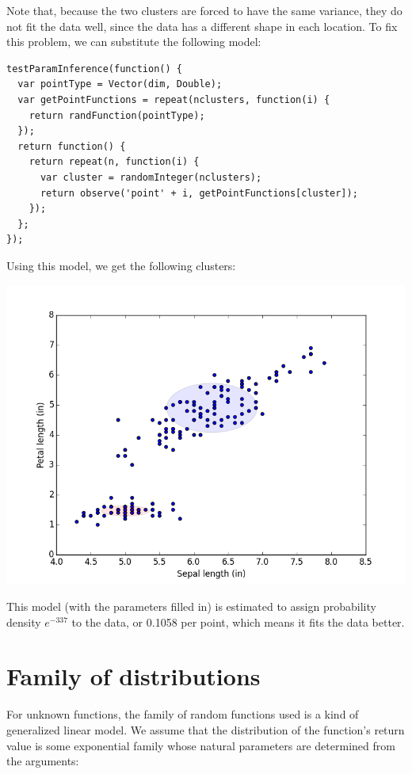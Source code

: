 \documentclass{article}
\begin{document}
  Note that, because the two clusters are forced to have the same variance, they do not fit the data well,
  since the data has a different shape in each location.  To fix this problem, we can substitute the following
  model:
  \begin{verbatim}
testParamInference(function() {
  var pointType = Vector(dim, Double);
  var getPointFunctions = repeat(nclusters, function(i) {
    return randFunction(pointType);
  });
  return function() {
    return repeat(n, function(i) {
      var cluster = randomInteger(nclusters);
      return observe('point' + i, getPointFunctions[cluster]);
    });
  };
});
  \end{verbatim}
  Using this model, we get the following clusters:
  \begin{center}
    \includegraphics[scale=0.5]{../plots/irisclusters_indep.png}
  \end{center}
  This model (with the parameters filled in) is estimated to assign probability density $e^{-337}$ to the data, or 0.1058 per point, which means it
  fits the data better.


  \section{Family of distributions}
  
    For unknown functions, the family of random functions used is a kind
    of generalized linear model.  We assume that the distribution
    of the function's return value
    is some exponential family whose natural
    parameters are determined from the arguments:
\end{document}
